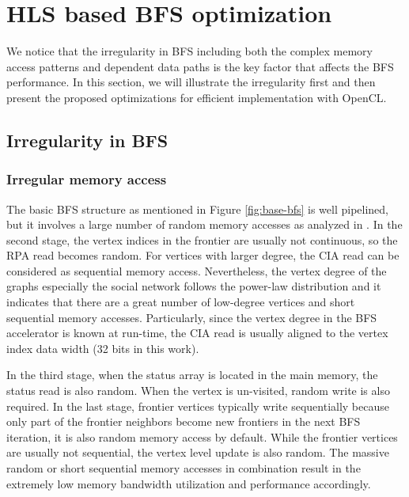 \section{HLS based BFS optimization} \label{sec:bfs-opt}
We notice that the irregularity in BFS including both the complex memory access patterns and dependent data 
paths is the key factor that affects the BFS performance. In this section, we will illustrate 
the irregularity first and then present the proposed optimizations for efficient implementation with OpenCL.

\subsection{Irregularity in BFS}
\subsubsection{Irregular memory access}
The basic BFS structure as mentioned in Figure \ref{fig:base-bfs} is well pipelined, 
but it involves a large number of random memory accesses as analyzed 
in \cite{Merrill2012scalable}. In the second stage, the vertex indices in the frontier 
are usually not continuous, so the RPA read becomes random. For vertices with 
larger degree, the CIA read can be considered as sequential memory access. Nevertheless, 
the vertex degree of the graphs especially the social network follows the power-law 
distribution and it indicates that there are a great number of low-degree vertices 
and short sequential memory accesses. Particularly, since the vertex degree in 
the BFS accelerator is known at run-time, the CIA read is usually aligned to the vertex 
index data width (32 bits in this work). 

In the third stage, when the status array 
is located in the main memory, the status read is also random. When the vertex is un-visited, 
random write is also required. In the last stage, frontier vertices typically write 
sequentially because only part of the frontier neighbors become new frontiers 
in the next BFS iteration, it is also random memory access by default. 
While the frontier vertices are usually not sequential, the vertex level update 
is also random. The massive random or short sequential
memory accesses in combination result in the extremely low memory bandwidth utilization and 
performance accordingly. 

